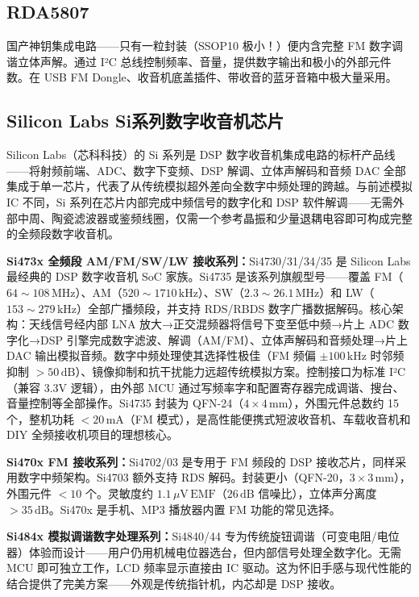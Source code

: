 \documentclass[12pt,UTF8]{ctexbook}
\begin{document}
\subsection{RDA5807}

国产神钥集成电路——只有一粒封装（SSOP10 极小！）便内含完整 FM 数字调谐立体声解。通过 I²C 总线控制频率、音量，提供数字输出和极小的外部元件数。在 USB FM Dongle、收音机底盖插件、带收音的蓝牙音箱中极大量采用。

\subsection{Silicon Labs Si系列数字收音机芯片}

Silicon Labs（芯科科技）的 Si 系列是 DSP 数字收音机集成电路的标杆产品线——将射频前端、ADC、数字下变频、DSP 解调、立体声解码和音频 DAC 全部集成于单一芯片，代表了从传统模拟超外差向全数字中频处理的跨越。与前述模拟 IC 不同，Si 系列在芯片内部完成中频信号的数字化和 DSP 软件解调——无需外部中周、陶瓷滤波器或鉴频线圈，仅需一个参考晶振和少量退耦电容即可构成完整的全频段数字收音机。

\textbf{Si473x 全频段 AM/FM/SW/LW 接收系列：}Si4730/31/34/35 是 Silicon Labs 最经典的 DSP 数字收音机 SoC 家族。Si4735 是该系列旗舰型号——覆盖 FM（$64\sim108\,\mathrm{MHz}$）、AM（$520\sim1710\,\mathrm{kHz}$）、SW（$2.3\sim26.1\,\mathrm{MHz}$）和 LW（$153\sim279\,\mathrm{kHz}$）全部广播频段，并支持 RDS/RBDS 数字广播数据解码。核心架构：天线信号经内部 LNA 放大→正交混频器将信号下变至低中频→片上 ADC 数字化→DSP 引擎完成数字滤波、解调（AM/FM）、立体声解码和音频处理→片上 DAC 输出模拟音频。数字中频处理使其选择性极佳（FM 频偏 $\pm100\,\mathrm{kHz}$ 时邻频抑制 $>50\,\mathrm{dB}$）、镜像抑制和抗干扰能力远超传统模拟方案。控制接口为标准 I²C（兼容 3.3V 逻辑），由外部 MCU 通过写频率字和配置寄存器完成调谐、搜台、音量控制等全部操作。Si4735 封装为 QFN-24（$4\times4\,\mathrm{mm}$），外围元件总数约 15 个，整机功耗 $<20\,\mathrm{mA}$（FM 模式），是高性能便携式短波收音机、车载收音机和 DIY 全频接收机项目的理想核心。

\textbf{Si470x FM 接收系列：}Si4702/03 是专用于 FM 频段的 DSP 接收芯片，同样采用数字中频架构。Si4703 额外支持 RDS 解码。封装更小（QFN-20，$3\times3\,\mathrm{mm}$），外围元件 $<10$ 个。灵敏度约 $1.1\,\mu\mathrm{V}\,\mathrm{EMF}$（$26\,\mathrm{dB}$ 信噪比），立体声分离度 $>35\,\mathrm{dB}$。Si470x 是手机、MP3 播放器内置 FM 功能的常见选择。

\textbf{Si484x 模拟调谐数字处理系列：}Si4840/44 专为传统旋钮调谐（可变电阻/电位器）体验而设计——用户仍用机械电位器选台，但内部信号处理全数字化。无需 MCU 即可独立工作，LCD 频率显示直接由 IC 驱动。这为怀旧手感与现代性能的结合提供了完美方案——外观是传统指针机，内芯却是 DSP 接收。
\end{document}
